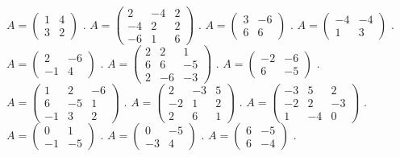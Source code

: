 \begin{tasks}
\task $A = \begin{pmatrix} 1 & 4 \\ 3 & 2 \end{pmatrix}$ .
\task $A = \begin{pmatrix} 2 & -4 & 2 \\ -4 & 2 & 2 \\ -6 & 1 & 6 \end{pmatrix}$ .
\task $A = \begin{pmatrix} 3 & -6 \\ 6 & 6 \end{pmatrix}$ .
\task $A = \begin{pmatrix} -4 & -4 \\ 1 & 3 \end{pmatrix}$ .
\task $A = \begin{pmatrix} 2 & -6 \\ -1 & 4 \end{pmatrix}$ .
\task $A = \begin{pmatrix} 2 & 2 & 1 \\ 6 & 6 & -5 \\ 2 & -6 & -3 \end{pmatrix}$ .
\task $A = \begin{pmatrix} -2 & -6 \\ 6 & -5 \end{pmatrix}$ .
\task $A = \begin{pmatrix} 1 & 2 & -6 \\ 6 & -5 & 1 \\ -1 & 3 & 2 \end{pmatrix}$ .
\task $A = \begin{pmatrix} 2 & -3 & 5 \\ -2 & 1 & 2 \\ 2 & 6 & 1 \end{pmatrix}$ .
\task $A = \begin{pmatrix} -3 & 5 & 2 \\ -2 & 2 & -3 \\ 1 & -4 & 0 \end{pmatrix}$ .
\task $A = \begin{pmatrix} 0 & 1 \\ -1 & -5 \end{pmatrix}$ .
\task $A = \begin{pmatrix} 0 & -5 \\ -3 & 4 \end{pmatrix}$ .
\task $A = \begin{pmatrix} 6 & -5 \\ 6 & -4 \end{pmatrix}$ .

\end{tasks}
